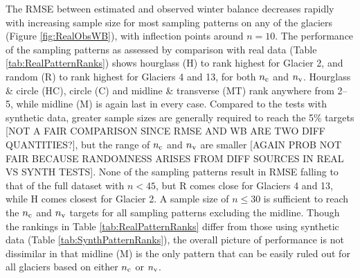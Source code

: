 \documentclass[twocolumn,letterpaper]{igs}
\begin{document}
\begin{table}[]
\begin{tabular}{clclclclclclcl}
\hline
\end{tabular}
\end{table}


The RMSE between estimated and observed winter balance decreases rapidly with increasing sample size for most sampling patterns on any of the glaciers (Figure \ref{fig:RealObsWB}), with inflection points around $n=10$. 
The performance of the sampling patterns as assessed by comparison with real data (Table \ref{tab:RealPatternRanks}) shows hourglass (H) to rank highest for Glacier 2, and random (R) to rank highest for Glaciers 4 and 13, for both $n_{\rm c}$ and $n_{\rm v}$. Hourglass \& circle (HC), circle (C) and midline \& transverse (MT) rank anywhere from 2--5, while midline (M) is again last in every case. 
Compared to the tests with synthetic data, greater sample sizes are generally required to reach the 5\% targets [NOT A FAIR COMPARISON SINCE RMSE AND WB ARE TWO DIFF QUANTITIES?], but the range of $n_{\rm c}$ and $n_{\rm v}$ are smaller  [AGAIN PROB NOT FAIR BECAUSE RANDOMNESS ARISES FROM DIFF SOURCES IN REAL VS SYNTH TESTS].
None of the sampling patterns result in RMSE falling to that of the full dataset with $n < 45$, but R comes close for Glaciers 4 and 13, while H comes closest for Glacier 2. A sample size of $n \leq 30$ is sufficient to reach the $n_{\rm c}$ and $n_{\rm v}$ targets for all sampling patterns excluding the midline. 
Though the rankings in Table \ref{tab:RealPatternRanks} differ from those using synthetic data (Table \ref{tab:SynthPatternRanks}), the overall picture of performance is not dissimilar in that midline (M) is the only pattern that can be easily ruled out for all glaciers based on either $n_{\rm c}$ or $n_{\rm v}$.      
\end{document}
